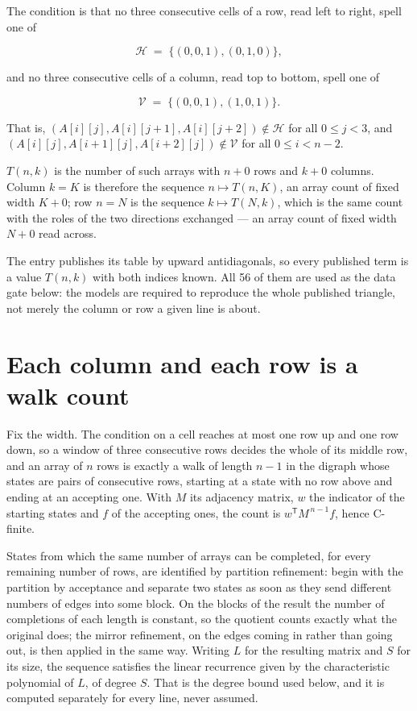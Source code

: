 \documentclass[11pt]{article}
\theoremstyle{definition}
\begin{document}
The condition is that no three consecutive cells of a row, read left to right, spell one of

\[\mathcal{H} \;=\; \{(0,0,1), (0,1,0)\},\]

and no three consecutive cells of a column, read top to bottom, spell one of

\[\mathcal{V} \;=\; \{(0,0,1), (1,0,1)\}.\]

That is, $(A[i][j],A[i][j{+}1],A[i][j{+}2]) \notin \mathcal{H}$ for all $0 \le j < 3$, and $(A[i][j],A[i{+}1][j],A[i{+}2][j]) \notin \mathcal{V}$ for all $0 \le i < n-2$.

$T(n,k)$ is the number of such arrays with $n + 0$ rows and $k + 0$ columns. Column $k = K$ is therefore the sequence $n \mapsto T(n,K)$, an array count of fixed width $K + 0$; row $n = N$ is the sequence $k \mapsto T(N,k)$, which is the same count with the roles of the two directions exchanged --- an array count of fixed width $N + 0$ read across.

The entry publishes its table by upward antidiagonals, so every published term is a value $T(n,k)$ with both indices known. All 56 of them are used as the data gate below: the models are required to reproduce the whole published triangle, not merely the column or row a given line is about.

\section{Each column and each row is a walk count}

Fix the width. The condition on a cell reaches at most one row up and one row down, so a window of three consecutive rows decides the whole of its middle row, and an array of $n$ rows is exactly a walk of length $n-1$ in the digraph whose states are pairs of consecutive rows, starting at a state with no row above and ending at an accepting one. With $M$ its adjacency matrix, $w$ the indicator of the starting states and $f$ of the accepting ones, the count is $w^{\mathsf T}M^{\,n-1}f$, hence C-finite.

States from which the same number of arrays can be completed, for every remaining number of rows, are identified by partition refinement: begin with the partition by acceptance and separate two states as soon as they send different numbers of edges into some block. On the blocks of the result the number of completions of each length is constant, so the quotient counts exactly what the original does; the mirror refinement, on the edges coming in rather than going out, is then applied in the same way. Writing $L$ for the resulting matrix and $S$ for its size, the sequence satisfies the linear recurrence given by the characteristic polynomial of $L$, of degree $S$. That is the degree bound used below, and it is computed separately for every line, never assumed.
\end{document}

